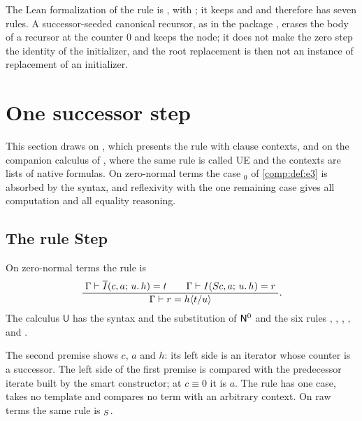 \begin{remark}
The Lean formalization of the rule is , with
; it keeps  and  and
therefore has seven rules. A successor-seeded canonical recursor, as in the
package , erases the body of a recursor at the
counter $0$ and keeps the node; it does not make the zero step the identity
of the initializer, and the root replacement is then not an instance of
replacement of an initializer.
\end{remark}

\section{One successor step}
\label{comp:sec:step}

This section draws on , which presents the rule
 with clause contexts, and on the companion calculus of
, where the same rule is called UE and the
contexts are lists of native formulas. On zero-normal terms the case
$_0$ of \cref{comp:def:e3} is absorbed by the syntax, and
reflexivity with the one remaining case gives all computation and all
equality reasoning.

\subsection{The rule Step}

\begin{definition}
\label{comp:def:step}
On zero-normal terms the rule  is
\[
 \dfrac{\;\Gamma\vdash\overline{I}(c,a;\,u.\,h)=t\qquad
          \Gamma\vdash I(S c,a;\,u.\,h)=r\;}{\;\Gamma\vdash r=h\langle t/u\rangle\;}.
\]
The calculus $\mathsf{U}$ has the syntax and the substitution of $\mathsf{N}^{0}$
and the six rules , , ,
,  and .
\end{definition}

The second premise shows $c$, $a$ and $h$: its left side is an iterator
whose counter is a successor. The left side of the first premise is compared
with the predecessor iterate built by the smart constructor; at $c\equiv0$
it is $a$. The rule has one case, takes no template and compares no term
with an arbitrary context. On raw terms the same rule is
$_{S}$.

